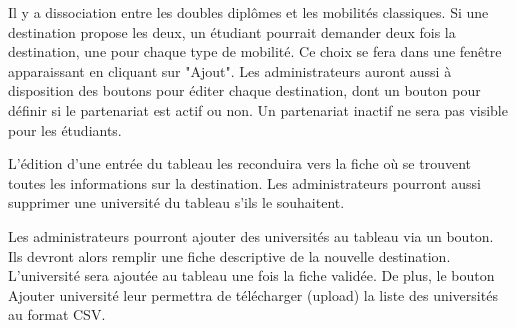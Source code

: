 Il y a dissociation entre les doubles diplômes et les mobilités classiques. Si une destination propose les deux, un étudiant pourrait demander deux fois la destination, une pour chaque type de mobilité. Ce choix se fera dans une fenêtre apparaissant en cliquant sur "Ajout". 
Les administrateurs auront aussi à disposition des boutons pour éditer chaque destination, dont un bouton pour définir si le partenariat est actif ou non. Un partenariat inactif ne sera pas visible pour les étudiants.

L'édition d'une entrée du tableau les reconduira vers la fiche où se trouvent toutes les informations sur la destination.
Les administrateurs pourront aussi supprimer une université du tableau s'ils le souhaitent.

Les administrateurs pourront ajouter des universités au tableau via un bouton. Ils devront alors remplir une fiche descriptive de la nouvelle destination. L'université sera ajoutée au tableau une fois la fiche validée. De plus, le bouton \og Ajouter université \fg{} leur permettra de télécharger (upload) la liste des universités au format CSV.
 
